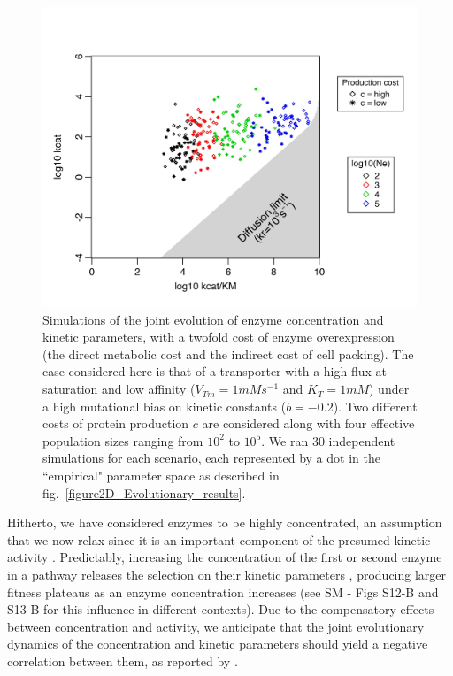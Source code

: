 \documentclass[nogrid,crop,final]{MBE2}%
\newcommand{\othercaption}[1]{\caption{\setlength{\baselineskip}{1.5\baselineskip}#1}}
\begin{document}
\begin{figure}[h!]
\centering
\includegraphics[scale=0.6,trim=0.25cm 0cm 0cm 0.75cm,clip]{Figures/Evo_Results_CostCrow_PaperModM.jpeg}
\othercaption{Simulations of the joint evolution of enzyme concentration and kinetic parameters, with a twofold cost of enzyme overexpression (the direct metabolic cost and the indirect cost of cell packing). The case considered here is that of a transporter with a high flux at saturation and low affinity ($V_{Tm}=1 mMs^{-1}$ and $K_T=1mM$) under a high mutational bias on kinetic constants ($b=-0.2$). Two different costs of protein production $c$ are considered along with four effective population sizes ranging from $10^2$ to $10^5$. We ran 30 independent simulations for each scenario, each represented by a dot in the ``empirical" parameter space as described in fig.~\ref{figure2D_Evolutionary_results}.
}
\label{figure2D_Evolutionary_results_HF}
\end{figure}

Hitherto, we have considered enzymes to be highly concentrated, an assumption that we now relax since it is an important component of the presumed kinetic activity \citep{Koshland02}. Predictably, increasing the concentration of the first or second enzyme in a pathway releases the selection on their kinetic parameters \citep{Noor16}, producing larger fitness plateaus as an enzyme concentration increases (see SM - Figs S12-B and S13-B for this influence in different contexts). Due to the compensatory effects between concentration and activity, we anticipate that the joint evolutionary dynamics of the concentration and kinetic parameters should yield a negative correlation between them, as reported by \citet{Davidi16,Davidi18}. 
\end{document}
